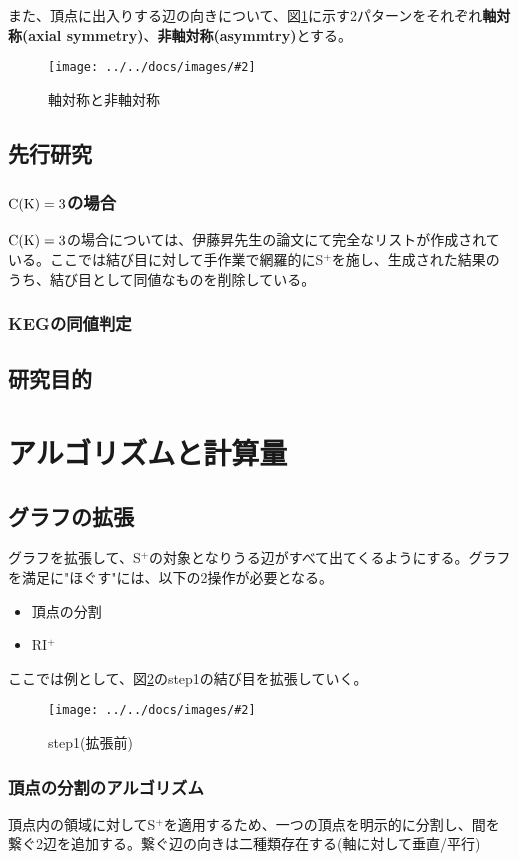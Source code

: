 \documentclass[11pt,a4j]{jarticle}
\newcommand{\splus}{S${}^\text{+}$}
\newcommand{\riplus}{RI${}^\text{+}$}
\newcommand{\f}[1]{$\rm{#1}$} %
\newcommand{\image}[4][height=100pt]{%
\begin{figure}[htbp]
    \centering
    \texttt{[image: ../../docs/images/\#2]}
    \caption{#3}
    \label{fig:#4}
\end{figure}%
}
\newcommand{\tops}[2]{\texorpdfstring{#1}{#2}} %
\begin{document}
また、頂点に出入りする辺の向きについて、図\ref{fig:axis}に示す2パターンをそれぞれ\textbf{軸対称(axial symmetry)}、\textbf{非軸対称(asymmtry)}とする。
\image{about_axis.jpg}{軸対称と非軸対称}{axis}

\subsection{先行研究}
\subsubsection{\tops{\f{C(K)=3}}{C(K)=3}の場合}
\f{C(K)=3}の場合については、伊藤昇先生の論文\cite{ck3}にて完全なリストが作成されている。ここでは結び目に対して手作業で網羅的に\splus を施し、生成された結果のうち、結び目として同値なものを削除している。

\subsubsection{KEGの同値判定}

\subsection{研究目的}

\section{アルゴリズムと計算量}

\subsection{グラフの拡張}
グラフを拡張して、\splus の対象となりうる辺がすべて出てくるようにする。グラフを満足に"ほぐす"には、以下の2操作が必要となる。
\begin{itemize}
    \item 頂点の分割
    \item \riplus
\end{itemize}

ここでは例として、図\ref{fig:default}のstep1の結び目を拡張していく。
\image{extend_default.jpg}{step1(拡張前)}{default}

\subsubsection{頂点の分割のアルゴリズム}
頂点内の領域に対して\splus を適用するため、一つの頂点を明示的に分割し、間を繋ぐ2辺を追加する。繋ぐ辺の向きは二種類存在する(軸に対して垂直/平行)
\end{document}
